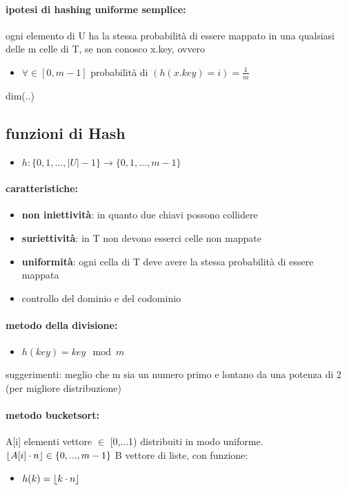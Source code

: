 \documentclass{article}
\DeclarePairedDelimiter\floor{\lfloor}{\rfloor}
\begin{document}
\paragraph{ipotesi di hashing uniforme semplice:} ogni elemento di U ha la stessa probabilità di essere mappato in una qualsiasi delle m celle di T, se non conosco 
x.key, ovvero 
\begin{itemize}
    \item $\forall \in [0,m-1]$ probabilità di $\displaystyle (h(x.key) = i) = \frac{1}{m}  $
\end{itemize}

dim(..)

\subsection{funzioni di Hash} %
\begin{itemize}
    \item $h: \{ 0,1,...,|U|-1 \} \rightarrow \{0,1,...,m-1\}$
\end{itemize}

\paragraph{caratteristiche:}
\begin{itemize}
    \item \textbf{non iniettività}: in quanto due chiavi possono collidere
    \item \textbf{suriettività}: in T non devono esserci celle non mappate
    \item \textbf{uniformità}: ogni cella di T deve avere la stessa probabilità di essere mappata
    \item controllo del dominio e del codominio
\end{itemize}

\paragraph{metodo della divisione:}
\begin{itemize}
    \item $h(key) = key \mod m$
\end{itemize}

suggerimenti: meglio che m sia un numero primo e lontano da una potenza di 2 (per migliore distribuzione)

\paragraph{metodo bucketsort:} A[i] elementi vettore $\in$ [0,...1) distribuiti in modo uniforme. 
$\floor{A[i] \cdot n} \in \{0,..., m-1\}$ B vettore di liste, con funzione:
\begin{itemize}
    \item $h(k) = \floor{k \cdot n}$
\end{itemize}
\end{document}
